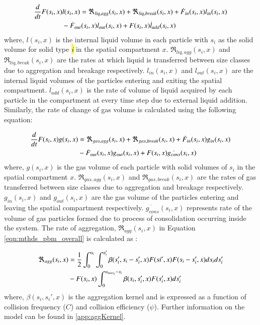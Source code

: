 \documentclass[review]{elsarticle}
\begin{document}
\begin{linenumbers}
\begin{align}
\frac{d}{dt}F(s_i,x)&l(s_i,x)= 
\Re_{liq,agg}(s_i,x)+\Re_{liq,break}(s_i,x)+\dot{F}_{in}(s_i,x)l_{in}(s_i,x)\notag\\
&-\dot{F}_{out}(s_i,x)l_{out}(s_i,x)+F(s_i,x)\dot{l}_{add}(s_i,x)
\label{eqn:mthds_pbm_rate} 
\end{align}
where, $l(s_i,x)$ is the internal liquid volume in each particle with ${s_i}$ as the 
solid volume for solid type \hl{\textit{i}} in the spatial compartment $x$. 
$\Re_{liq,agg}(s_i,x)$ and $\Re_{liq,break}(s_i,x)$ are the rates at which liquid is transferred 
between size classes due to aggregation and breakage respectively. $l_{in}(s_i,x)$ 
and $l_{out}(s_i,x)$ are the internal liquid volumes of the particles entering and exiting 
the spatial compartment. $\dot{l_{add}}(s_i,x)$ is the rate of volume of liquid acquired 
by each particle in the compartment at every time step due to external liquid addition.
Similarly, the rate of change of gas volume is calculated using the following equation: 

\begin{align}
\frac{d}{dt}F(s_i,x)g(s_i,x)&= 
\Re_{gas,agg}(s_i,x)+\Re_{gas,break}(s_i,x)+\dot{F}_{in}(s_i,x)g_{in}(s_i,x)\notag\\
&-\dot{F}_{out}(s_i,x)g_{out}(s_i,x)+F(s_i,x)\dot{g_{cons}}(s_i,x)
\label{eqn:mthds_pbm_gas_agg} 
\end{align}
where, $g(s_i,x)$ is the gas volume of each particle with solid volumes of $s_i$ 
in the spatial compartment $x$. $\Re_{gas,agg}(s_i,x)$ and $\Re_{gas,break}(s_i,x)$ are 
the rates of gas transferred between size classes due to aggregation and 
breakage respectively. 
$g_{in}(s_i,x)$ and $g_{out}(s_i,x)$ are the gas volume of the particles entering and 
leaving the spatial compartment respectively. $\dot{g_{cons}}(s_i,x)$ represents 
rate of the volume of 
gas particles formed due to process of consolidation occurring inside the system. The 
rate of aggregation, $\Re_{agg}(s_i,x)$ in Equation \ref{eqn:mthds_pbm_overall} is 
calculated as \citep{Chaturbedi2017}:

\begin{align}
\Re_{agg}(s_i,x)&= \frac{1}{2}\int _0^{s_i} \int _0^{s_i'} 
\beta(s_i',s_i-s_i',x)F(si',x)F(s_i-s_i',x)ds_ids_i'\notag\\ 
&- F(s_i,x)\int _0^{s_{max_i}-s_i} 
\beta(s_i,s_i',x)F(s_i',x)ds_i'
\label{eqn:mthds_R_agg}
\end{align}
where, $\beta(s_i, s_i',x)$ is the aggregation kernel and is expressed as a 
function of collision frequency ($C$) and collision efficiency ($\psi$). Further 
information on the model can be found in \ref{app:aggKernel}.


\end{linenumbers}
\end{document}
